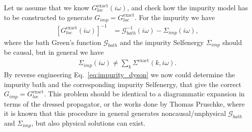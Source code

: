 \documentclass[12pt,a4paper]{scrartcl}
\numberwithin{equation}{section}
\begin{document}
Let us assume that we know $G^{\mathrm{exact}}_{loc}(i\omega)$, and check how the impurity model
has to be constructed to generate $G_{imp}=G^{\mathrm{exact}}_{loc}$. For the impurity we have
\begin{align}
 \left[G^{\mathrm{exact}}_{loc} (i\omega)\right]^{-1}
 &=  \mathcal{G}^{-1}_{bath}(i\omega) - \Sigma_{imp}(i\omega),
 \label{eq:impurity_dyson}
\end{align}
where the bath Green's function $\mathcal{G}_{bath}$ and the impurity 
Selfenergy $\Sigma_{imp}$ should be causal, but in general we have
\begin{align}
 \Sigma_{imp}(i\omega) \neq \sum_k \Sigma^{\mathrm{exact}}(k,i\omega) .
\end{align}
By reverse engineering Eq.~\eqref{eq:impurity_dyson} we now could determine the
impurity bath and the corresponding impurity Selfenergy, that give the correct
$G_{imp}=G^{\mathrm{exact}}_{loc}$.
This problem should be identical to a diagrammatic expansion in terms of 
the dressed propagator, or the works done by Thomas Pruschke, where
it is known that this procedure in general generates noncausal/unphysical
$\mathcal{G}_{bath}$ and $\Sigma_{imp}$, but also physical solutions can exist.
\end{document}
